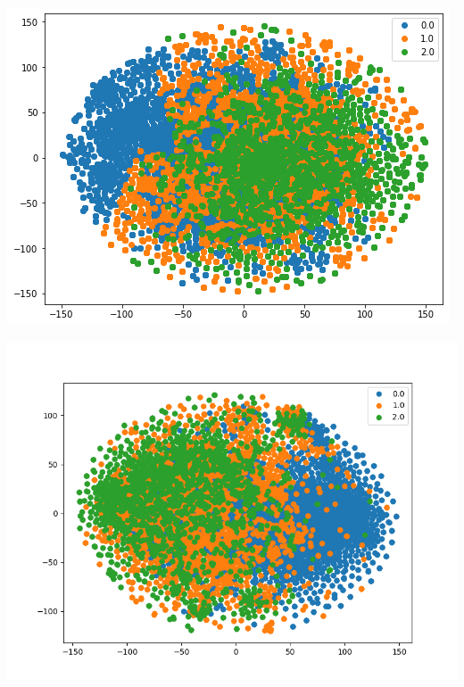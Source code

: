 \documentclass[11pt]{article}
\begin{document}
\begin{center}
\begin{minipage}{0.3\linewidth}
    \end{minipage}
\end{center}


\begin{center}
    \begin{minipage}{0.3\linewidth}
    \includegraphics[width=\linewidth]{07.png}
    \end{minipage}
    \begin{minipage}{0.3\linewidth}
    \includegraphics[width=\linewidth]{08.png}
    \end{minipage}
    \begin{minipage}{0.3\linewidth}

\end{minipage}
\end{center}
\end{document}
